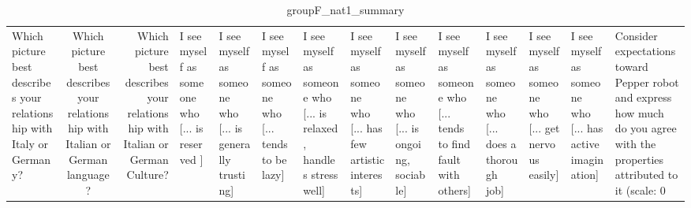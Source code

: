 \begin{table}
\caption{groupF_nat1_summary}
\label{tab:groupF_nat1_summary}
\begin{tabular}{lcr}
\toprule
Which picture best describes your relationship with Italy or Germany? & Which picture best describes your relationship with Italian or German language? & Which picture best describes your relationship with Italian or German Culture? & I see myself as someone who  [... is reserved ] & I see myself as someone who  [... is generally trusting] & I see myself as someone who  [... tends to be lazy] & I see myself as someone who  [... is relaxed, handles stress well] & I see myself as someone who  [... has few artistic interests] & I see myself as someone who  [... is ongoing, sociable] & I see myself as someone who  [... tends to find fault with others] & I see myself as someone who  [... does a thorough job] & I see myself as someone who  [... get nervous easily] & I see myself as someone who  [... has active imagination] & Consider expectations toward Pepper robot and express how much do you agree with the properties attributed to it (scale: 0%
\end{tabular}
\end{table}
